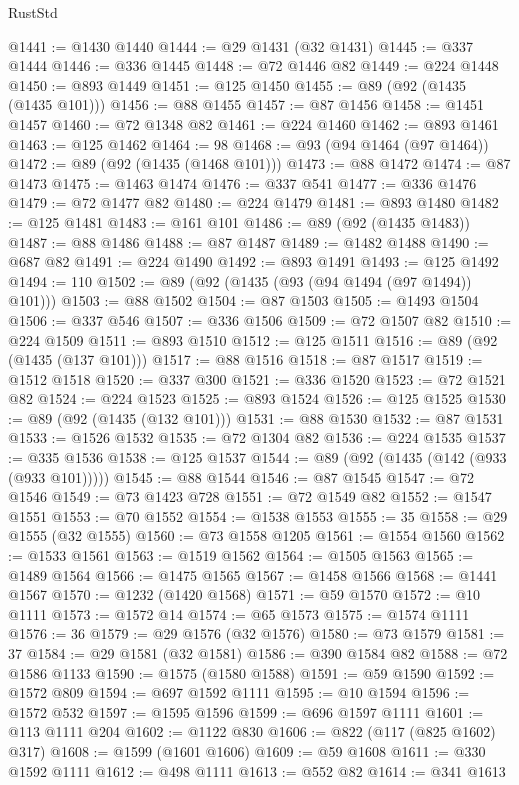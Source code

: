 \begin{lexlean}{RustStd}
\begin{coremodule}
{\begin{coremodule}
{{{{{{{{{{{{{{{{{{{{{{{{{{{{{{{{{{{{{{{{{{{{{{{{{{{{{{{@1441 := @1430 @1440
@1444 := @29 @1431 (@32 @1431)
@1445 := @337 @1444
@1446 := @336 @1445
@1448 := @72 @1446 @82
@1449 := @224 @1448
@1450 := @893 @1449
@1451 := @125 @1450
@1455 := @89 (@92 (@1435 (@1435 @101)))
@1456 := @88 @1455
@1457 := @87 @1456
@1458 := @1451 @1457
@1460 := @72 @1348 @82
@1461 := @224 @1460
@1462 := @893 @1461
@1463 := @125 @1462
@1464 := 98
@1468 := @93 (@94 @1464 (@97 @1464))
@1472 := @89 (@92 (@1435 (@1468 @101)))
@1473 := @88 @1472
@1474 := @87 @1473
@1475 := @1463 @1474
@1476 := @337 @541
@1477 := @336 @1476
@1479 := @72 @1477 @82
@1480 := @224 @1479
@1481 := @893 @1480
@1482 := @125 @1481
@1483 := @161 @101
@1486 := @89 (@92 (@1435 @1483))
@1487 := @88 @1486
@1488 := @87 @1487
@1489 := @1482 @1488
@1490 := @687 @82
@1491 := @224 @1490
@1492 := @893 @1491
@1493 := @125 @1492
@1494 := 110
@1502 := @89 (@92 (@1435 (@93 (@94 @1494 (@97 @1494)) @101)))
@1503 := @88 @1502
@1504 := @87 @1503
@1505 := @1493 @1504
@1506 := @337 @546
@1507 := @336 @1506
@1509 := @72 @1507 @82
@1510 := @224 @1509
@1511 := @893 @1510
@1512 := @125 @1511
@1516 := @89 (@92 (@1435 (@137 @101)))
@1517 := @88 @1516
@1518 := @87 @1517
@1519 := @1512 @1518
@1520 := @337 @300
@1521 := @336 @1520
@1523 := @72 @1521 @82
@1524 := @224 @1523
@1525 := @893 @1524
@1526 := @125 @1525
@1530 := @89 (@92 (@1435 (@132 @101)))
@1531 := @88 @1530
@1532 := @87 @1531
@1533 := @1526 @1532
@1535 := @72 @1304 @82
@1536 := @224 @1535
@1537 := @335 @1536
@1538 := @125 @1537
@1544 := @89 (@92 (@1435 (@142 (@933 (@933 @101)))))
@1545 := @88 @1544
@1546 := @87 @1545
@1547 := @72 @1546
@1549 := @73 @1423 @728
@1551 := @72 @1549 @82
@1552 := @1547 @1551
@1553 := @70 @1552
@1554 := @1538 @1553
@1555 := 35
@1558 := @29 @1555 (@32 @1555)
@1560 := @73 @1558 @1205
@1561 := @1554 @1560
@1562 := @1533 @1561
@1563 := @1519 @1562
@1564 := @1505 @1563
@1565 := @1489 @1564
@1566 := @1475 @1565
@1567 := @1458 @1566
@1568 := @1441 @1567
@1570 := @1232 (@1420 @1568)
@1571 := @59 @1570
@1572 := @10 @1111
@1573 := @1572 @14
@1574 := @65 @1573
@1575 := @1574 @1111
@1576 := 36
@1579 := @29 @1576 (@32 @1576)
@1580 := @73 @1579
@1581 := 37
@1584 := @29 @1581 (@32 @1581)
@1586 := @390 @1584 @82
@1588 := @72 @1586 @1133
@1590 := @1575 (@1580 @1588)
@1591 := @59 @1590
@1592 := @1572 @809
@1594 := @697 @1592 @1111
@1595 := @10 @1594
@1596 := @1572 @532
@1597 := @1595 @1596
@1599 := @696 @1597 @1111
@1601 := @113 @1111 @204
@1602 := @1122 @830
@1606 := @822 (@117 (@825 @1602) @317)
@1608 := @1599 (@1601 @1606)
@1609 := @59 @1608
@1611 := @330 @1592 @1111
@1612 := @498 @1111
@1613 := @552 @82
@1614 := @341 @1613
}}}}}}}}}}}}}}}}}}}}}}}}}}}}}}}}}}}}}}}}}}}}}}}}}}}}}}}
\end{coremodule}}
\end{coremodule}
\end{lexlean}
